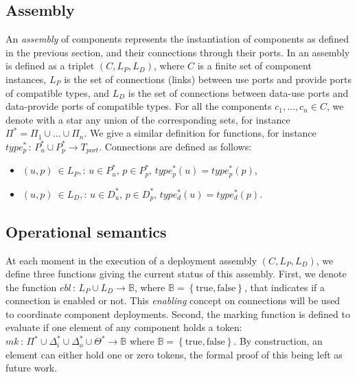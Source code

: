 \subsection{Assembly}

An \emph{assembly} of components represents the instantiation of
components as defined in the previous section, and their connections
through their ports. In \mad an assembly is defined as a triplet
$(C, L_{P}, L_{D})$, where $C$ is a finite set of component instances,
$L_{P}$ is the set of connections (links) between use ports and
provide ports of compatible types, and $L_{D}$ is the set of
connections between data-use ports and data-provide ports of
compatible types. For all the components $c_1,\dots,c_n \in C$, we
denote with a star any union of the corresponding sets, for instance
$\Pi^* = \Pi_1 \cup \dots \cup \Pi_n$. We give a similar definition
for functions, for instance
$type_{p}^*\,:\,P_{u}^*\cup P_{p}^*\rightarrow T_{port}$. Connections
are defined as follows:

\begin{itemize}
\item $\left(u,p\right)\ \in L_{P},:\,u\in P_{u}^{*},\,p\in P_{p}^{*},\,type_{p}^{*}\left(u\right)=type_{p}^{*}\left(p\right)$,
\item $\left(u,p\right)\ \in L_{D},:\,u\in D_{u}^{*},\,p\in D_{p}^{*},\,type_{d}^{*}\left(u\right)=type_{d}^{*}\left(p\right)$.
\end{itemize}

\subsection{Operational semantics}
\label{subsec:operational_semantics}

At each moment in the execution of a \mad deployment assembly
$(C, L_{P}, L_{D})$, we define three functions giving the current
status of this assembly. First, we denote the function
$ebl\,:\,L_{P}\cup L_{D}\rightarrow\mathbb{B}$, where
$\mathbb{B}=\left\{ \text{true},\text{false}\right\}$, that indicates
if a connection is enabled or not. This \emph{enabling} concept on
connections will be used to coordinate component deployments. Second,
the marking function is defined to evaluate if one element of any
component holds a token:
$mk\,:\,\Pi^{*}\cup\Delta_{i}^{*}\cup\Delta_{o}^{*}\cup\Theta^{*}\rightarrow\mathbb{B}$
where $\mathbb{B}=\left\{ \text{true},\text{false}\right\}$. By
construction, an element can either hold one or zero tokens, the
formal proof of this being left as future work.

